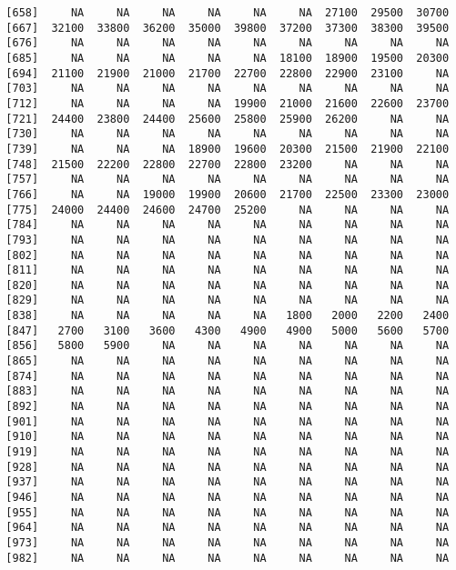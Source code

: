 \documentclass[]{article}
\begin{document}
\begin{verbatim}
  [658]     NA     NA     NA     NA     NA     NA  27100  29500  30700
  [667]  32100  33800  36200  35000  39800  37200  37300  38300  39500
  [676]     NA     NA     NA     NA     NA     NA     NA     NA     NA
  [685]     NA     NA     NA     NA     NA  18100  18900  19500  20300
  [694]  21100  21900  21000  21700  22700  22800  22900  23100     NA
  [703]     NA     NA     NA     NA     NA     NA     NA     NA     NA
  [712]     NA     NA     NA     NA  19900  21000  21600  22600  23700
  [721]  24400  23800  24400  25600  25800  25900  26200     NA     NA
  [730]     NA     NA     NA     NA     NA     NA     NA     NA     NA
  [739]     NA     NA     NA  18900  19600  20300  21500  21900  22100
  [748]  21500  22200  22800  22700  22800  23200     NA     NA     NA
  [757]     NA     NA     NA     NA     NA     NA     NA     NA     NA
  [766]     NA     NA  19000  19900  20600  21700  22500  23300  23000
  [775]  24000  24400  24600  24700  25200     NA     NA     NA     NA
  [784]     NA     NA     NA     NA     NA     NA     NA     NA     NA
  [793]     NA     NA     NA     NA     NA     NA     NA     NA     NA
  [802]     NA     NA     NA     NA     NA     NA     NA     NA     NA
  [811]     NA     NA     NA     NA     NA     NA     NA     NA     NA
  [820]     NA     NA     NA     NA     NA     NA     NA     NA     NA
  [829]     NA     NA     NA     NA     NA     NA     NA     NA     NA
  [838]     NA     NA     NA     NA     NA   1800   2000   2200   2400
  [847]   2700   3100   3600   4300   4900   4900   5000   5600   5700
  [856]   5800   5900     NA     NA     NA     NA     NA     NA     NA
  [865]     NA     NA     NA     NA     NA     NA     NA     NA     NA
  [874]     NA     NA     NA     NA     NA     NA     NA     NA     NA
  [883]     NA     NA     NA     NA     NA     NA     NA     NA     NA
  [892]     NA     NA     NA     NA     NA     NA     NA     NA     NA
  [901]     NA     NA     NA     NA     NA     NA     NA     NA     NA
  [910]     NA     NA     NA     NA     NA     NA     NA     NA     NA
  [919]     NA     NA     NA     NA     NA     NA     NA     NA     NA
  [928]     NA     NA     NA     NA     NA     NA     NA     NA     NA
  [937]     NA     NA     NA     NA     NA     NA     NA     NA     NA
  [946]     NA     NA     NA     NA     NA     NA     NA     NA     NA
  [955]     NA     NA     NA     NA     NA     NA     NA     NA     NA
  [964]     NA     NA     NA     NA     NA     NA     NA     NA     NA
  [973]     NA     NA     NA     NA     NA     NA     NA     NA     NA
  [982]     NA     NA     NA     NA     NA     NA     NA     NA     NA

\end{verbatim}
\end{document}
